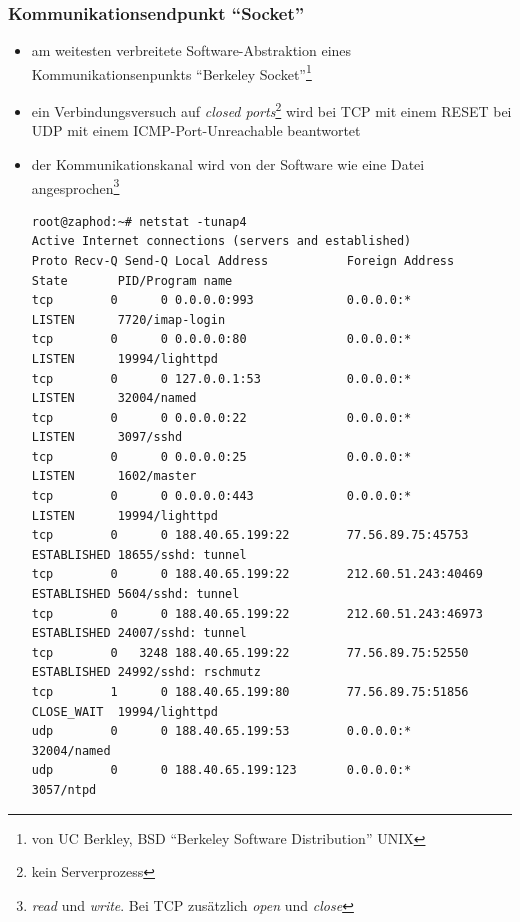 \documentclass[ignorenonframetext]{beamer}
\begin{document}
\begin{frame}[fragile]
\frametitle{Kommunikationsendpunkt ``Socket''}
\begin{itemize}
	\item{am weitesten verbreitete Software-Abstraktion eines Kommunikationsenpunkts ``Berkeley Socket''{}\footnote{von UC Berkley, BSD ``Berkeley Software Distribution''
	UNIX}}
	\item{ein Verbindungsversuch auf {\em closed ports}{}\footnote{kein Serverprozess} wird bei TCP mit einem RESET bei UDP mit einem ICMP-Port-Unreachable beantwortet}
	\item{der Kommunikationskanal wird von der Software wie eine Datei angesprochen\footnote{{\em read} und {\em write}. Bei TCP zus\"atzlich {\em open} und {\em close}}}\\
	\begin{tiny}
	\begin{verbatim}
root@zaphod:~# netstat -tunap4
Active Internet connections (servers and established)
Proto Recv-Q Send-Q Local Address           Foreign Address         State       PID/Program name
tcp        0      0 0.0.0.0:993             0.0.0.0:*               LISTEN      7720/imap-login 
tcp        0      0 0.0.0.0:80              0.0.0.0:*               LISTEN      19994/lighttpd  
tcp        0      0 127.0.0.1:53            0.0.0.0:*               LISTEN      32004/named     
tcp        0      0 0.0.0.0:22              0.0.0.0:*               LISTEN      3097/sshd       
tcp        0      0 0.0.0.0:25              0.0.0.0:*               LISTEN      1602/master     
tcp        0      0 0.0.0.0:443             0.0.0.0:*               LISTEN      19994/lighttpd  
tcp        0      0 188.40.65.199:22        77.56.89.75:45753       ESTABLISHED 18655/sshd: tunnel 
tcp        0      0 188.40.65.199:22        212.60.51.243:40469     ESTABLISHED 5604/sshd: tunnel
tcp        0      0 188.40.65.199:22        212.60.51.243:46973     ESTABLISHED 24007/sshd: tunnel 
tcp        0   3248 188.40.65.199:22        77.56.89.75:52550       ESTABLISHED 24992/sshd: rschmutz
tcp        1      0 188.40.65.199:80        77.56.89.75:51856       CLOSE_WAIT  19994/lighttpd  
udp        0      0 188.40.65.199:53        0.0.0.0:*                           32004/named     
udp        0      0 188.40.65.199:123       0.0.0.0:*                           3057/ntpd       
	\end{verbatim}
	\end{tiny}
\end{itemize}
\end{frame}
\end{document}
